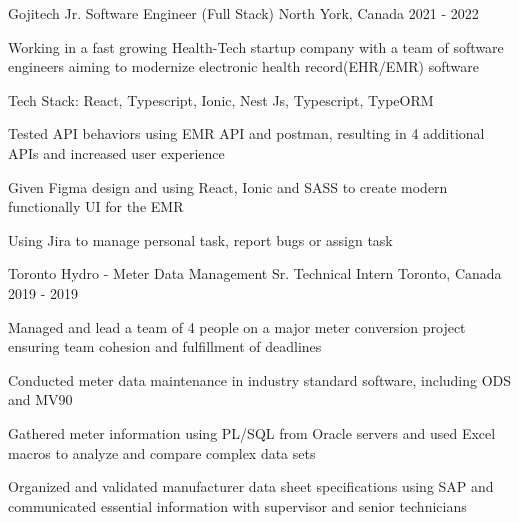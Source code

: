 


\begin{cventries}


\cventry
{Gojitech} %
{Jr. Software Engineer (Full Stack)} %
{North York, Canada} %
{2021 - 2022} %
{ %
\begin{cvitems}
\item {Working in a fast growing Health-Tech startup company with a team of software engineers aiming to modernize electronic health record(EHR/EMR) software}
\item {Tech Stack: React, Typescript, Ionic, Nest Js, Typescript, TypeORM}
\item {Tested API behaviors using EMR API and postman, resulting in 4 additional APIs and increased user experience}
\item {Given Figma design and using React, Ionic and SASS to create modern functionally UI for the EMR}
\item {Using Jira to manage personal task, report bugs or assign task}
\end{cvitems}
}




\cventry
{Toronto Hydro - Meter Data Management} %
{Sr. Technical Intern} %
{Toronto, Canada} %
{2019 - 2019} %
{ %
\begin{cvitems}
\item {Managed and lead a team of 4 people on a major meter conversion project ensuring team cohesion and fulfillment of deadlines}
\item {Conducted meter data maintenance in industry standard software, including ODS and MV90}
\item {Gathered meter information using PL/SQL from Oracle servers and used Excel macros to analyze and compare complex data sets}
\item {Organized and validated manufacturer data sheet specifications using SAP and communicated essential information with supervisor and senior technicians}
\end{cvitems}
}




\end{cventries}